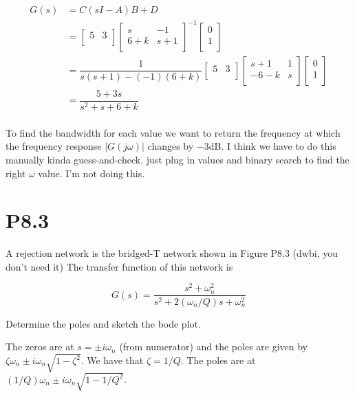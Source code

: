 \documentclass[11pt]{article}
\begin{document}
\begin{align*}
    G(s) &= C(sI - A)B + D \\
    &= \begin{bmatrix}
        5 & 3 \\
    \end{bmatrix}
    \begin{bmatrix}
        s & -1 \\
        6 + k & s + 1 \\
    \end{bmatrix}^{-1}
    \begin{bmatrix}
        0 \\
        1 \\
    \end{bmatrix} \\
    &= \dfrac{1}{s(s + 1) - (-1)(6 + k)}
    \begin{bmatrix}
        5 & 3 \\
    \end{bmatrix}
    \begin{bmatrix}
        s + 1 & 1 \\
        -6 - k & s \\
    \end{bmatrix}
    \begin{bmatrix}
        0 \\
        1 \\
    \end{bmatrix} \\
    &= \dfrac{5 + 3s}{s^2 + s + 6 + k} \\
\end{align*}

To find the bandwidth for each value we want to return the frequency at which the frequency response $|G(j\omega)|$ changes by $-3$dB. I think we have to do this manually kinda guess-and-check. just plug in values and binary search to find the right $\omega$ value. I'm not doing this.

\section{P8.3}

A rejection network is the bridged-T network shown in Figure P8.3 (dwbi, you don't need it) The transfer function of this network is

\[ G(s) = \dfrac{s^2 + \omega^2_n}{s^2 + 2 (\omega_n / Q)s + \omega^2_n} \]

Determine the poles and sketch the bode plot.

The zeros are at $s = \pm i \omega_n$ (from numerator) and the poles are given by $\zeta \omega_n \pm i \omega_n \sqrt{1 - \zeta^2}$. We have that $\zeta = 1/Q$. The poles are at $(1/Q) \omega_n \pm i \omega_n \sqrt{1 - 1/Q^2}$.
\end{document}
